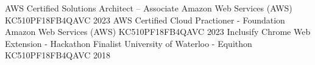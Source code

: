 

\begin{cvhonors}

  \cvhonor
  {AWS Certified Solutions Architect – Associate} %
  {Amazon Web Services (AWS)} %
  {KC510PF18FB4QAVC} %
  {2023} %
  \cvhonor
  {AWS Certified Cloud Practioner - Foundation} %
  {Amazon Web Services (AWS)} %
  {KC510PF18FB4QAVC} %
  {2023} %
  \cvhonor
  {Inclusify Chrome Web Extension - Hackathon Finalist} %
  {University of Waterloo - Equithon} %
  {KC510PF18FB4QAVC} %
  {2018} %
\end{cvhonors}
